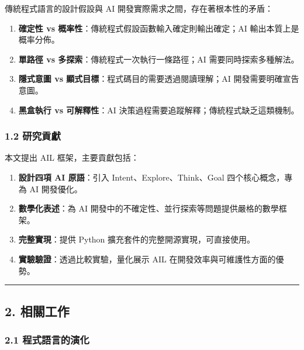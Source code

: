 傳統程式語言的設計假設與 AI 開發實際需求之間，存在著根本性的矛盾：

\begin{enumerate}
\def\labelenumi{\arabic{enumi}.}
\tightlist
\item
  \textbf{確定性 vs 概率性}：傳統程式假設函數輸入確定則輸出確定；AI
  輸出本質上是概率分佈。
\item
  \textbf{單路徑 vs 多探索}：傳統程式一次執行一條路徑；AI
  需要同時探索多種解法。
\item
  \textbf{隱式意圖 vs 顯式目標}：程式碼目的需要透過閱讀理解；AI
  開發需要明確宣告意圖。
\item
  \textbf{黑盒執行 vs 可解釋性}：AI
  決策過程需要追蹤解釋；傳統程式缺乏這類機制。
\end{enumerate}

\subsubsection{1.2 研究貢獻}\label{ux7814ux7a76ux8ca2ux737b}

本文提出 AIL 框架，主要貢獻包括：

\begin{enumerate}
\def\labelenumi{\arabic{enumi}.}
\tightlist
\item
  \textbf{設計四項 AI 原語}：引入 Intent、Explore、Think、Goal
  四个核心概念，專為 AI 開發優化。
\item
  \textbf{數學化表述}：為 AI
  開發中的不確定性、並行探索等問題提供嚴格的數學框架。
\item
  \textbf{完整實現}：提供 Python 擴充套件的完整開源實現，可直接使用。
\item
  \textbf{實驗驗證}：透過比較實驗，量化展示 AIL
  在開發效率與可維護性方面的優勢。
\end{enumerate}

\begin{center}\rule{0.5\linewidth}{0.5pt}\end{center}

\subsection{2. 相關工作}\label{ux76f8ux95dcux5de5ux4f5c}

\subsubsection{2.1
程式語言的演化}\label{ux7a0bux5f0fux8a9eux8a00ux7684ux6f14ux5316}

